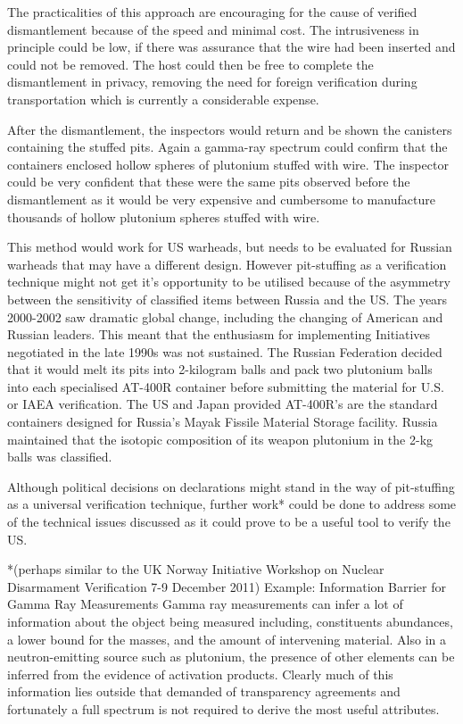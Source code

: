 \documentclass[twoside,titlepage,11pt,twocolumn,a4paper]{article}
\begin{document}
The practicalities of this approach are encouraging for the cause of
verified dismantlement because of the speed and minimal cost. The
intrusiveness in principle could be low, if there was assurance that
the wire had been inserted and could not be removed. The host could
then be free to complete the dismantlement in privacy, removing the
need for foreign verification during transportation which is currently
a considerable expense.

After the dismantlement, the inspectors would return and be shown the
canisters containing the stuffed pits. Again a gamma-ray spectrum
could confirm that the containers enclosed hollow spheres of plutonium
stuffed with wire. The inspector could be very confident that these
were the same pits observed before the dismantlement as it would be
very expensive and cumbersome to manufacture thousands of hollow
plutonium spheres stuffed with wire.

\citep{matthew1998} This method would work for US warheads, but needs
to be evaluated for Russian warheads that may have a different
design. \citep{zarimpas2003} However pit-stuffing as a verification technique
might not get it's opportunity to be utilised because of the asymmetry
between the sensitivity of classified items between Russia and the
US. The years 2000-2002 saw dramatic global change, including the
changing of American and Russian leaders. This meant that the
enthusiasm for implementing Initiatives negotiated in the late 1990s
was not sustained. The Russian Federation decided that it would melt
its pits into 2-kilogram balls and pack two plutonium balls into each
specialised AT-400R container before submitting the material for
U.S. or IAEA verification. The US and Japan provided AT-400R's are the
standard containers designed for Russia's Mayak Fissile Material
Storage facility. Russia maintained that the isotopic composition of
its weapon plutonium in the 2-kg balls was classified. \citep{IPFN2008}

Although political decisions on declarations might stand in the way of
pit-stuffing as a universal verification technique, further work*
could be done to address some of the technical issues discussed as it
could prove to be a useful tool to verify the US.

*(perhaps similar to the UK Norway Initiative Workshop on Nuclear
Disarmament Verification 7-9 December 2011) Example: Information
Barrier for Gamma Ray Measurements Gamma ray measurements can infer a
lot of information about the object being measured including,
constituents abundances, a lower bound for the masses, and the amount
of intervening material. Also in a neutron-emitting source such as
plutonium, the presence of other elements can be inferred from the
evidence of activation products. Clearly much of this information lies
outside that demanded of transparency agreements and fortunately a
full spectrum is not required to derive the most useful attributes.
\end{document}
